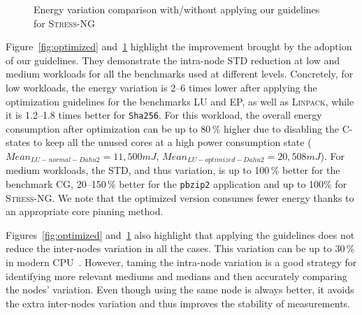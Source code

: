 \begin{figure}[htb]
    \caption{Energy variation comparison with/without applying our guidelines for \textsc{Stress-NG}}\label{fig:stress}
\end{figure}

Figure~\ref{fig:optimized} and~\ref{fig:stress} highlight the improvement brought by the adoption of our guidelines.
They demonstrate the intra-node STD reduction at low and medium workloads for all the benchmarks used at different levels.
Concretely, for low workloads, the energy variation is 2--6 times lower after applying the optimization guidelines for the benchmarks \textsf{LU} and \textsf{EP}, as well as \textsc{Linpack}, while it is 1.2--1.8 times better for \texttt{Sha256}.
For this workload, the overall energy consumption after optimization can be up to 80\,\% higher due to disabling the C-states to keep all the unused cores at a high power consumption state ($Mean_{LU-normal-Dahu2}=11,500 mJ$, $Mean_{LU-optimized-Dahu2}=20,508 mJ$).
For medium workloads, the STD, and thus variation, is up to 100\,\% better for the benchmark \textsf{CG}, 20--150\,\% better for the \texttt{pbzip2} application and up to 100\% for \textsc{Stress-NG}.
We note that the optimized version consumes fewer energy thanks to an appropriate core pinning method.

Figures~\ref{fig:optimized} and~\ref{fig:stress} also highlight that applying the guidelines does not reduce the inter-nodes variation in all the cases.
This variation can be up to 30\,\% in modern CPU~\cite{wang_experimental_nodate}.
However, taming the intra-node variation is a good strategy for identifying more relevant mediums and medians and then accurately comparing the nodes' variation.
Even though using the same node is always better, it avoids the extra inter-nodes variation and thus improves the stability of measurements.


